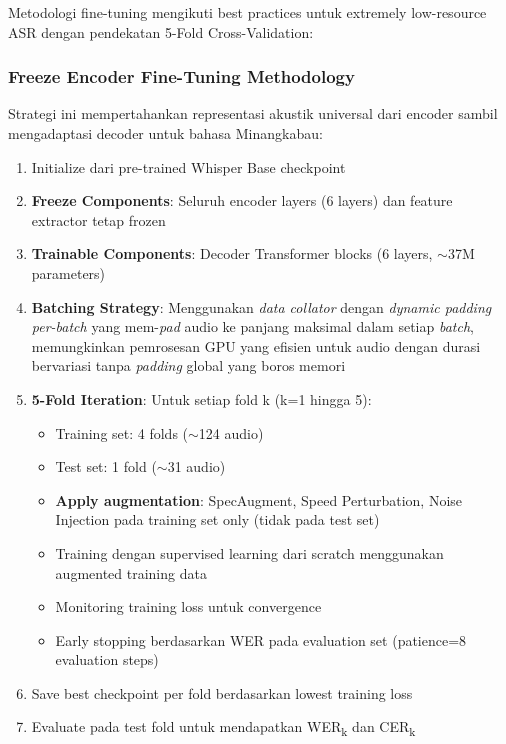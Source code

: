 Metodologi fine-tuning mengikuti best practices untuk extremely low-resource ASR dengan pendekatan 5-Fold Cross-Validation:

\subsubsection{Freeze Encoder Fine-Tuning Methodology}

Strategi ini mempertahankan representasi akustik universal dari encoder sambil mengadaptasi decoder untuk bahasa Minangkabau:

\begin{enumerate}[noitemsep]
    \item Initialize dari pre-trained Whisper Base checkpoint
    \item \textbf{Freeze Components}: Seluruh encoder layers (6 layers) dan feature extractor tetap frozen
    \item \textbf{Trainable Components}: Decoder Transformer blocks (6 layers, $\sim$37M parameters)
    \item \textbf{Batching Strategy}: Menggunakan \textit{data collator} dengan \textit{dynamic padding per-batch} yang mem-\textit{pad} audio ke panjang maksimal dalam setiap \textit{batch}, memungkinkan pemrosesan GPU yang efisien untuk audio dengan durasi bervariasi tanpa \textit{padding} global yang boros memori
    \item \textbf{5-Fold Iteration}: Untuk setiap fold k (k=1 hingga 5):
    \begin{itemize}[noitemsep]
        \item Training set: 4 folds ($\sim$124 audio)
        \item Test set: 1 fold ($\sim$31 audio)
        \item \textbf{Apply augmentation}: SpecAugment, Speed Perturbation, Noise Injection pada training set only (tidak pada test set)
        \item Training dengan supervised learning dari scratch menggunakan augmented training data
        \item Monitoring training loss untuk convergence
        \item Early stopping berdasarkan WER pada evaluation set (patience=8 evaluation steps)
    \end{itemize}
    \item Save best checkpoint per fold berdasarkan lowest training loss
    \item Evaluate pada test fold untuk mendapatkan WER\textsubscript{k} dan CER\textsubscript{k}
\end{enumerate}

